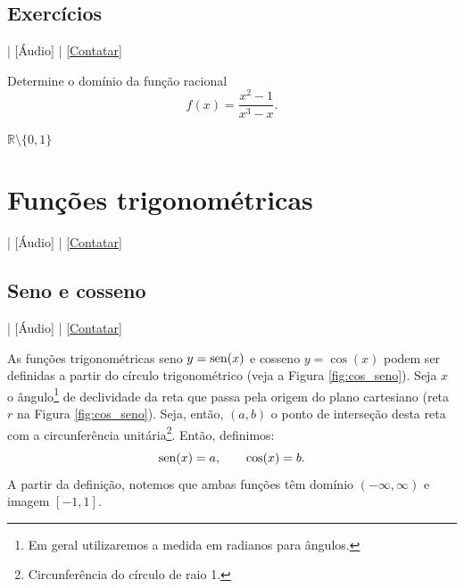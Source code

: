 \subsection*{Exercícios}

\begin{flushright}
  [Vídeo] | [Áudio] | \href{https://phkonzen.github.io/notas/contato.html}{[Contatar]}
\end{flushright}

\begin{exer}
  Determine o domínio da função racional
  \begin{equation}
    f(x) = \frac{x^2-1}{x^3-x}.
  \end{equation}
\end{exer}
\begin{resp}
  $\mathbb{R}\setminus\{0, 1\}$
\end{resp}


\section{Funções trigonométricas}\label{cap_funcao_sec_funtri}

\begin{flushright}
  [Vídeo] | [Áudio] | \href{https://phkonzen.github.io/notas/contato.html}{[Contatar]}
\end{flushright}

\subsection{Seno e cosseno}

\begin{flushright}
  [Vídeo] | [Áudio] | \href{https://phkonzen.github.io/notas/contato.html}{[Contatar]}
\end{flushright}

As funções trigonométricas seno $y=\operatorname{sen}(x)$ e cosseno $y=\cos(x)$ podem ser definidas a partir do círculo trigonométrico (veja a Figura \ref{fig:cos_seno}). Seja $x$ o ângulo\footnote{Em geral utilizaremos a medida em radianos para ângulos.} de declividade da reta que passa pela origem do plano cartesiano (reta $r$ na Figura \ref{fig:cos_seno}). Seja, então, $(a,b)$ o ponto de interseção desta reta com a circunferência unitária\footnote{Circunferência do círculo de raio 1.}. Então, definimos:
\begin{equation}
  \operatorname{sen}(x) = a,\qquad \cos(x) = b.
\end{equation}
A partir da definição, notemos que ambas funções têm domínio $(-\infty, \infty)$ e imagem $[-1, 1]$.

